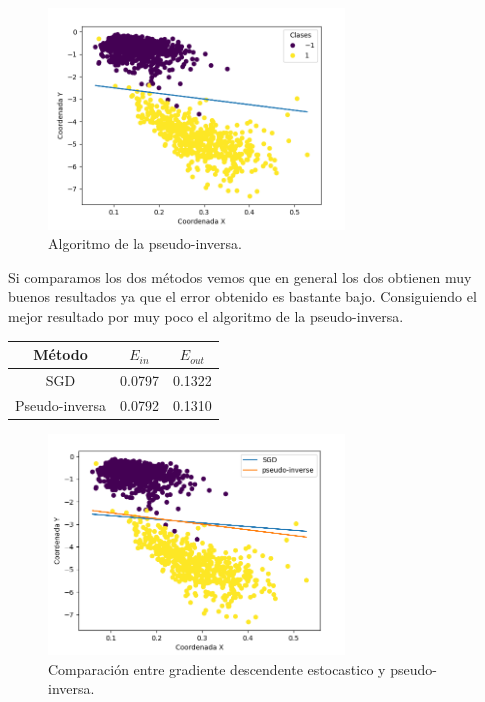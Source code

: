 \documentclass[size=a4, parskip=half, titlepage=false, toc=flat, toc=bib, 12pt]{scrartcl}
\begin{document}
\begin{enumerate}
\begin{figure}[H]
\centering
\includegraphics[width=0.7\textwidth]{./img/ej22}
\caption{Algoritmo de la pseudo-inversa.}
\end{figure}

Si comparamos los dos métodos vemos que en general los dos obtienen muy buenos resultados
ya que el error obtenido es bastante bajo. Consiguiendo el mejor resultado por muy poco el algoritmo
de la pseudo-inversa.

\begin{table}[H]
\centering
\begin{tabular}{ccc}
\hline
Método         & $E_{in}$ & $E_{out}$ \\ \hline
SGD            & 0.0797   & 0.1322    \\ \hline
Pseudo-inversa & 0.0792   & 0.1310    \\ \hline
\end{tabular}
\end{table}

\begin{figure}[H]
\centering
\includegraphics[width=0.7\textwidth]{./img/ej222}
\caption{Comparación entre gradiente descendente estocastico y pseudo-inversa.}
\end{figure}


\end{enumerate}
\end{document}

